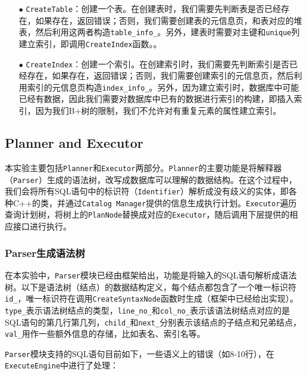 \documentclass[12pt]{article}
\begin{document}
    \begin{itemize}
        \item[$\bullet$] \texttt{CreateTable}：创建一个表。在创建表时，我们需要先判断表是否已经存在，如果存在，返回错误；否则，我们需要创建表的元信息页，和表对应的堆表，然后利用这两者构造\texttt{table\_info\_}。另外，建表时需要对主键和\texttt{unique}列建立索引，即调用\texttt{CreateIndex}函数。。
        \item[$\bullet$] \texttt{CreateIndex}：创建一个索引。在创建索引时，我们需要先判断索引是否已经存在，如果存在，返回错误；否则，我们需要创建索引的元信息页，然后利用索引的元信息页构造\texttt{index\_info\_}。另外，因为建立索引时，数据库中可能已经有数据，因此我们需要对数据库中已有的数据进行索引的构建，即插入索引，因为我们B+树的限制，我们不允许对有重复元素的属性建立索引。
    \end{itemize}

    \subsection{Planner and Executor}
    本实验主要包括\texttt{Planner}和\texttt{Executor}两部分。\texttt{Planner}的主要功能是将解释器（\texttt{Parser}）生成的语法树，改写成数据库可以理解的数据结构。在这个过程中，我们会将所有SQL语句中的标识符（\texttt{Identifier}）解析成没有歧义的实体，即各种C++的类，并通过\texttt{Catalog Manager}提供的信息生成执行计划。\texttt{Executor}遍历查询计划树，将树上的\texttt{PlanNode}替换成对应的\texttt{Executor}，随后调用下层提供的相应接口进行执行。

    \subsubsection{Parser生成语法树}
    在本实验中，\texttt{Parser}模块已经由框架给出，功能是将输入的SQL语句解析成语法树。以下是语法树（结点）的数据结构定义，每个结点都包含了一个唯一标识符\texttt{id\_}，唯一标识符在调用\texttt{CreateSyntaxNode}函数时生成（框架中已经给出实现）。\texttt{type\_}表示语法树结点的类型，\texttt{line\_no\_}和\texttt{col\_no\_}表示该语法树结点对应的是SQL语句的第几行第几列，\texttt{child\_}和\texttt{next\_}分别表示该结点的子结点和兄弟结点，\texttt{val\_}用作一些额外信息的存储，比如表名、索引名等。

    \texttt{Parser}模块支持的SQL语句目前如下，一些语义上的错误（如8-10行），在\texttt{ExecuteEngine}中进行了处理：
\lstset{language=SQL}
\end{document}
